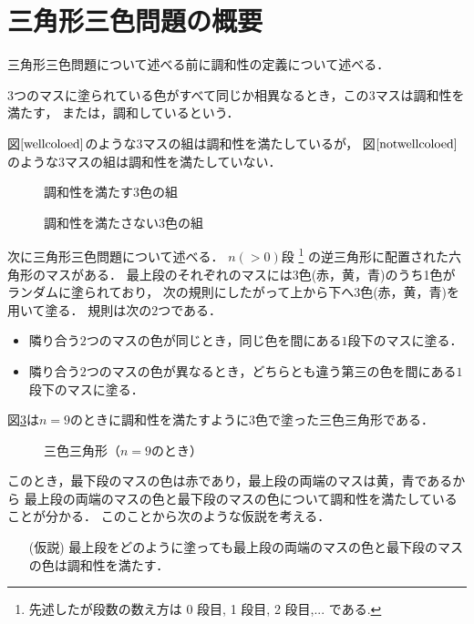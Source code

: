 \section{三角形三色問題の概要}
三角形三色問題について述べる前に調和性の定義について述べる．
\begin{dfn}[調和性] \label{dfn:wc}
  $3$つのマスに塗られている色がすべて同じか相異なるとき，この$3$マスは調和性を満たす，
  または，調和しているという．
\end{dfn}
\begin{exm}
  図$\ref{wellcoloed}$のような$3$マスの組は調和性を満たしているが，
  図$\ref{notwellcoloed}$のような$3$マスの組は調和性を満たしていない．
  \begin{figure}[h]
    \centering
    
    \caption{調和性を満たす$3$色の組}
    \label{wellcoloed}
  \end{figure}
  \begin{figure}[h]
    \centering
    
    \caption{調和性を満たさない$3$色の組}
    \label{notwellcoloed}
  \end{figure}
\end{exm}

次に三角形三色問題について述べる．
$n(>0)$段
\footnote{
  先述したが段数の数え方は 0 段目, 1 段目, 2 段目,... である.
  }
の逆三角形に配置された六角形のマスがある．
最上段のそれぞれのマスには$3$色(赤，黄，青)のうち1色がランダムに塗られており，
次の規則にしたがって上から下へ$3$色(赤，黄，青)を用いて塗る．
規則は次の$2$つである．
\begin{itemize}
  \item
    隣り合う$2$つのマスの色が同じとき，同じ色を間にある$1$段下のマスに塗る．
  \item
    隣り合う$2$つのマスの色が異なるとき，どちらとも違う第三の色を間にある$1$段下のマスに塗る．
\end{itemize}
図\ref{fig:nine_steps}は$n=9$のときに調和性を満たすように3色で塗った三色三角形である．
\begin{figure}[h]
    \centering
    
    \caption{三色三角形（$n=9$のとき）}
    \label{fig:nine_steps}
\end{figure}

このとき，最下段のマスの色は赤であり，最上段の両端のマスは黄，青であるから
最上段の両端のマスの色と最下段のマスの色について調和性を満たしていることが分かる．
このことから次のような仮説を考える．
\begin{itemize}
  \item[(仮説)]
  最上段をどのように塗っても最上段の両端のマスの色と最下段のマスの色は調和性を満たす．
\end{itemize}

